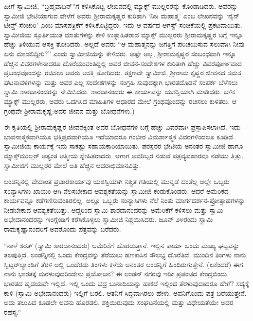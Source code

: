 ಹೀಗೆ ಸ್ವಾಮೀಜಿ, “ಬ್ರಹ್ಮವಾದಿನ್​”ಗೆ ಕಳಿಸಿಕೊಟ್ಟ ಲೇಖನದಲ್ಲಿ ಮ್ಯಾಕ್ಸ್ ಮುಲ್ಲರರನ್ನು ಕೊಂಡಾಡಿದರು. ಅವರನ್ನು ಸ್ವಾಮೀಜಿ ಭೇಟಿಯಾಗುವ ವೇಳೆಗೆ ಅವರು ಶ್ರೀರಾಮಕೃಷ್ಣರ ಕುರಿತಾಗಿ ‘ನಿಜ ಮಹಾತ್ಮ’ ಎಂಬ ಲೇಖನವನ್ನು ‘ನೈನ್​ಟೀನ್ತ್ ಸೆಂಚುರಿ’ ಎಂಬ ಮಾಸಪತ್ರಿಕೆಗೆ ಕಳಿಸಿಕೊಟ್ಟಿದ್ದರು. ಇದು ಆ ವರ್ಷದ ಆಗಸ್ಟ್ ಸಂಚಿಕೆಯಲ್ಲಿ ಪ್ರಕಟವಾಯಿತು. ಸ್ವಾಮೀಜಿಯ ಸ್ಫೂರ್ತಿಯುತ ಮಾತುಗಳನ್ನು ಕೇಳಿ ಉತ್ಸಾಹಿತರಾದ ಮ್ಯಾಕ್ಸ್ ಮುಲ್ಲರರು ಶ್ರೀರಾಮಕೃಷ್ಣರ ಬಗ್ಗೆ ಇನ್ನೂ ಹೆಚ್ಚು ತಿಳಿಯುವ ಆಸಕ್ತಿ ತೋರಿದರು. ಅಲ್ಲದೆ ಅವರು “ಆ ಮಹಾತ್ಮನನ್ನು ಜಗತ್ತಿಗೆ ಪರಿಚಯಿಸುವ ಸಲುವಾಗಿ ನೀವು ಏನು ಮಾಡಲಿದ್ದೀರಿ?” ಎಂದು ಸ್ವಾಮೀಜಿಯನ್ನು ಕೇಳಿದರು. ಅಷ್ಟೇ ಅಲ್ಲ, ಶ್ರೀರಾಮಕೃಷ್ಣರ ಸಂಬಂಧವಾಗಿ ಇನ್ನೂ ಹೆಚ್ಚಿನ ವಿವರಗಳೇನಾದರೂ ದೊರೆಯುವಂತಿದ್ದಲ್ಲಿ ಅವರ ಜೀವನ-ಸಂದೇಶಗಳ ಕುರಿತಾಗಿ ಹೆಚ್ಚು ವಿವರಪೂರ್ಣವಾದ ಪ್ರಬಂಧವೊಂದನ್ನು ರಚಿಸಲು ಅವರು ಆಸಕ್ತಿ ತೋರಿದರು. ತಕ್ಷಣವೇ ಸ್ವಾಮೀಜಿ, ಶ್ರೀರಾಮ ಕೃಷ್ಣರ ಜೀವನದ ಸಮಸ್ತ ಘಟನಾವಳಿಗಳನ್ನು ಮತ್ತು ಅವರ ಎಲ್ಲ ಸಂದೇಶಗಳನ್ನು ಸಂಗ್ರಹಿ ಸುವುದಕ್ಕಾಗಿ ಭಾರತದೊಡನೆ ಸಂಪರ್ಕ ಬೆಳೆಸಲು ಸ್ವಾಮಿ ಶಾರದಾನಂದರನ್ನು ನೇಮಿಸಿದರು. ಶಾರದಾನಂದರು ಈ ಕಾರ್ಯವನ್ನು ಯಶಸ್ವಿಯಾಗಿ ಮಾಡಿದರು. ಬಳಿಕ ಮ್ಯಾಕ್ಸ್ ಮುಲ್ಲರರು, ಅವರು ಒದಗಿಸಿದ ಮಾಹಿತಿಗಳ ಆಧಾರದ ಮೇಲೆ ಗ್ರಂಥವೊಂದನ್ನು ರಚಿಸಲು ಕುಳಿತರು. ಆ ಗ್ರಂಥವೇ ಶ್ರೀರಾಮಕೃಷ್ಣ:ಅವರ ಜೀವನ ಮತ್ತು ಬೋಧನೆಗಳು.)

ಈ ಕೃತಿಯಲ್ಲಿ ಶ್ರೀರಾಮಕೃಷ್ಣರ ಜೀವನಕ್ಕಿಂತ ಅವರ ಬೋಧನೆಗಳ ಬಗ್ಗೆ ಹೆಚ್ಚು ವಿವರವಾಗಿ ಪ್ರಸ್ತಾಪಿಸಲಾಗಿದೆ. ಇದು ಭಾವನಾತ್ಮಕವಾಗಿಯೂ ಭಕ್ತಿಪ್ರದವಾಗಿಯೂ ಇದೆಯಾದರೂ ಗಂಭೀರ ವಿಮರ್ಶಾತ್ಮಕ ವಿವರಗಳಿಂದಲೂ ಕೂಡಿದೆ. ಸ್ವಾಮೀಜಿಯ ಕಾರ್ಯಕ್ಕೆ ಇದು ಸಾಕಷ್ಟು ಸಹಾಯಕಾರಿಯಾಯಿತು. ಪರಸ್ಪರರ ಭೇಟಿಯ ಅನಂತರ ಸ್ವಾಮೀಜಿ ಹಾಗೂ ಮ್ಯಾಕ್ಸ್​ಮುಲ್ಲರ್ ಅತ್ಯಂತ ಆತ್ಮೀಯ ಸ್ನೇಹಿತರಾದರು. ಆಗಾಗ ಅವರಿಬ್ಬರ ನಡುವೆ ಪತ್ರವ್ಯವಹಾರವೂ ನಡೆಯು ತ್ತಿತ್ತು. ಸ್ವಾಮೀಜಿಗೆ ಮುಲ್ಲರರ ಮೇಲೆ ಅತಿ ಹೆಚ್ಚಿನ ಆದರಾಭಿಮಾನವಿತ್ತು.

ಲಂಡನ್ನಿನಲ್ಲಿ ವೇದಾಂತ ಪ್ರಚಾರಕಾರ್ಯವು ಯಶಸ್ವಿಯಾಗಿ ನಿಶ್ಚಿತ ಗತಿಯಲ್ಲಿ ಮುನ್ನಡೆ ದಂತೆಲ್ಲ ಅಲ್ಲೇ ಒಬ್ಬರು ಸಂನ್ಯಾಸಿಗಳು ಖಾಯಂ ಆಗಿ ನೆಲಸಬೇಕಾದ ಆವಶ್ಯಕತೆಯನ್ನು ಸ್ವಾಮೀಜಿ ಕಂಡುಕೊಂಡರು. ಆದರೆ ಅಮೆರಿಕದ ಕಾರ್ಯವನ್ನೂ ಕಡೆಗಣಿಸುವಂತಿರಲಿಲ್ಲ. ಅಲ್ಲೂ ಒಬ್ಬರು ಸಂನ್ಯಾಸಿಗಳು ನೆಲೆ ನಿಂತು ಮಾರ್ಗದರ್ಶನ-ಪ್ರೋತ್ಸಾಹಗಳನ್ನು ನೀಡಬೇಕಾದ ಆವಶ್ಯಕತೆಯಿತ್ತು. ಆದ್ದರಿಂದ ಸ್ವಾಮಿ ಶಾರದಾನಂದರನ್ನು ಅಮೆರಿಕೆಗೆ ಕಳಿಸಲು ಮತ್ತು ಸ್ವಾಮಿ ಅಭೇದಾನಂದರನ್ನು ಇಂಗ್ಲೆಂಡಿಗೆ ಕರೆಸಿಕೊಳ್ಳಲು ಸ್ವಾಮೀಜಿ ನಿಶ್ಚಯಿಸಿದರು. ಜೂನ್ ೨೪ರಂದು ಸ್ವಾಮಿ ರಾಮಕೃಷ್ಣಾನಂದರಿಗೆ ಅವರೊಂದು ಪತ್ರವನ್ನು ಬರೆದರು:

“ನಾಳೆ ಶರತ್ (ಸ್ವಾಮಿ ಶಾರದಾನಂದರು) ಅಮೆರಿಕೆಗೆ ಹೊರಡುತ್ತಾನೆ. ಇಲ್ಲಿನ ಕಾರ್ಯ ಒಂದು ಮುಖ್ಯ ಘಟ್ಟವನ್ನು ತಲಪುತ್ತಿದೆ. ಲಂಡನ್ನಿನಲ್ಲಿ ಒಂದು ಕೇಂದ್ರವನ್ನು ತೆರೆಯಲು ಹಣಕಾಸಿನ ಸೌಲಭ್ಯ ದೊರೆತಿದೆ. ಮುಂದಿನ ತಿಂಗಳು ನಾನು ಸ್ವಿಟ್ಸರ್​ಲ್ಯಾಂಡಿಗೆ ತೆರಳಿ ಅಲ್ಲಿ ಒಂದೆರಡು ತಿಂಗಳು ಕಳೆದು ಅನಂತರ ಲಂಡನ್ನಿಗೆ ಹಿಂದಿರುಗುತ್ತೇನೆ. (ಏಕೆಂದರೆ) ಈಗ ನಾನು ಭಾರತಕ್ಕೆ ಮರಳುವುದರಿಂದೇನು ಪ್ರಯೋಜನ? ಈ ಲಂಡನ್ ನಗರವು ಇಡೀ ಪ್ರಪಂಚದ ಕೇಂದ್ರಬಿಂದು. ಭಾರತದ ಹೃದಯವೇ ಇಲ್ಲಿದೆ. ಇಲ್ಲಿ ಒಂದು ಭದ್ರ ಬುನಾದಿಯನ್ನು ಹಾಕದೆ ಇಲ್ಲಿಂದ ತೆರಳುವುದಾದರೂ ಹೇಗೆ? ಸದ್ಯಕ್ಕೆ ಕಾಳಿ (ಸ್ವಾಮಿ ಅಭೇದಾನಂದರು) ಇಲ್ಲಿಗೆ ಬರಲಿ. ಆತನಿಗೆ ಸಿದ್ಧವಾಗಿರಲು ಹೇಳು. ಅವನಿಗೊಂದು ಪತ್ರ ಬರೆಯುತ್ತೇನೆ. ಅದು ತಲುಪಿದ ಕೂಡಲೇ ಅವನು ಹೊರಡಲಿ. ಶಕ್ತಿಯಿರುವುದು ಸಂಘಟನೆಯಲ್ಲಿ ಮತ್ತು ವಿಧೇಯತೆಯೇ ಅದರ ರಹಸ್ಯ.”

